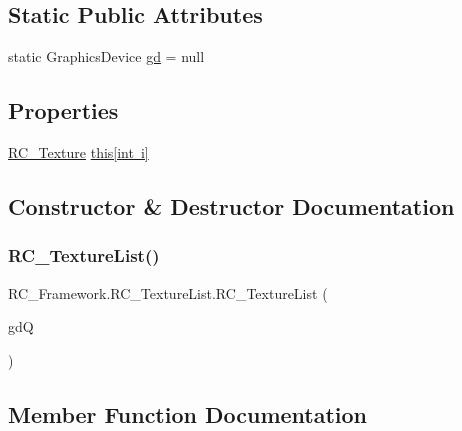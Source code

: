 \subsection*{Static Public Attributes}
\begin{DoxyCompactItemize}
\item 
static Graphics\+Device \mbox{\hyperlink{class_r_c___framework_1_1_r_c___texture_list_a6db2897d42c44cba05f70c298cead868}{gd}} = null
\end{DoxyCompactItemize}
\subsection*{Properties}
\begin{DoxyCompactItemize}
\item 
\mbox{\hyperlink{class_r_c___framework_1_1_r_c___texture}{R\+C\+\_\+\+Texture}} \mbox{\hyperlink{class_r_c___framework_1_1_r_c___texture_list_a9d074e0f2ea00d7dddfcea4296884b81}{this\mbox{[}int i\mbox{]}}}
\end{DoxyCompactItemize}


\subsection{Constructor \& Destructor Documentation}
\mbox{\label{class_r_c___framework_1_1_r_c___texture_list_aae5e2fc95b13e241affc4a696ab6e508}} 
\subsubsection{\texorpdfstring{R\+C\+\_\+\+Texture\+List()}{RC\_TextureList()}}
{\footnotesize\ttfamily R\+C\+\_\+\+Framework.\+R\+C\+\_\+\+Texture\+List.\+R\+C\+\_\+\+Texture\+List (\begin{DoxyParamCaption}\item[{Graphics\+Device}]{gdQ }\end{DoxyParamCaption})}



\subsection{Member Function Documentation}
\mbox{\label{class_r_c___framework_1_1_r_c___texture_list_a9662672a6fcc69b081b6c81c8f687cc0}} 
